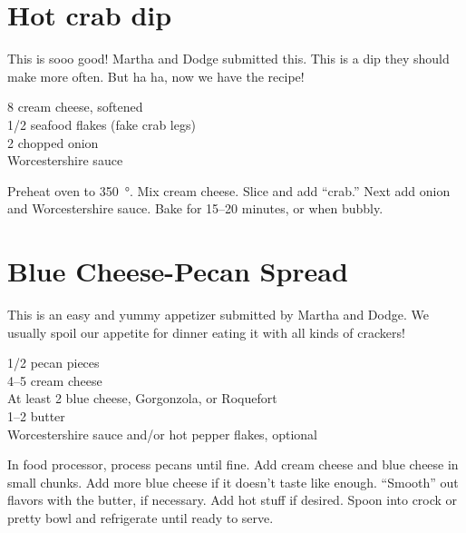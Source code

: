 \section{Hot crab dip}

\begin{open}
  This is sooo good! Martha and Dodge submitted this. This is a dip they
  should make more often. But ha ha, now we have the recipe!
\end{open}
\begin{ingredients}
  \SI{8}{\ounce} cream cheese, softened\\
  \SI{1/2}{\pound} seafood flakes (fake crab legs)\\
  \SI{2}{\tblspoon} chopped onion\\
  Worcestershire sauce
\end{ingredients}
Preheat oven to \SI{350}{\degree}. Mix cream cheese. Slice and add ``crab.''
Next add onion and Worcestershire sauce. Bake for \numrange{15}{20} minutes,
or when bubbly.

\section{Blue Cheese-Pecan Spread}

\begin{open}
  This is an easy and yummy appetizer submitted by Martha and Dodge.  We
  usually spoil our appetite for dinner eating it with all kinds of crackers!
\end{open}
\begin{ingredients}
  \SI{1/2}{\cup} pecan pieces\\
  \SIrange{4}{5}{\ounce} cream cheese\\
  At least \SI{2}{\tblspoon} blue cheese, Gorgonzola, or Roquefort\\
  \SIrange{1}{2}{\tblspoon} butter \\
  Worcestershire sauce and/or hot pepper flakes, optional
\end{ingredients}
In food processor, process pecans until fine. Add cream cheese and blue cheese
in small chunks. Add more blue cheese if it doesn't taste like enough.
``Smooth'' out flavors with the butter, if necessary. Add hot stuff if
desired.  Spoon into crock or pretty bowl and refrigerate until ready to
serve.
